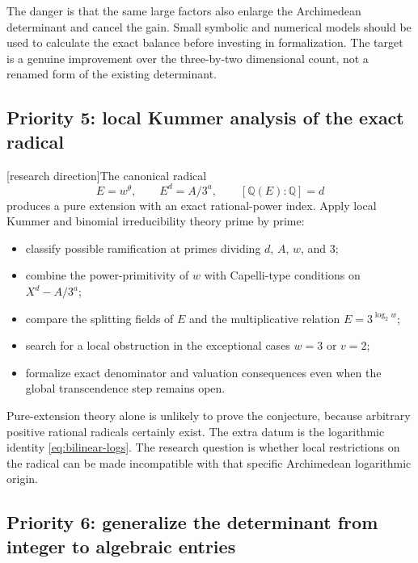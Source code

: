 \documentclass[11pt,oneside]{article}
\theoremstyle{definition}
\newcommand{\Q}{\mathbb Q}
\newcommand{\tagProposal}{\textcolor{BrickRed}{\textsf{[research direction]}}}
\begin{document}
The danger is that the same large factors also enlarge the Archimedean determinant and
cancel the gain.  Small symbolic and numerical models should be used to calculate the exact
balance before investing in formalization.  The target is a genuine improvement over the
three-by-two dimensional count, not a renamed form of the existing determinant.

\subsection{Priority 5: local Kummer analysis of the exact radical}

\tagProposal The canonical radical
\[
  E=w^\theta,
  \qquad E^d=A/3^a,
  \qquad [\Q(E):\Q]=d
\]
produces a pure extension with an exact rational-power index.  Apply local Kummer and
binomial irreducibility theory prime by prime:
\begin{itemize}
\item classify possible ramification at primes dividing \(d\), \(A\), \(w\), and \(3\);
\item combine the power-primitivity of \(w\) with Capelli-type conditions on
\(X^d-A/3^a\);
\item compare the splitting fields of \(E\) and the multiplicative relation
\(E=3^{\log_2w}\);
\item search for a local obstruction in the exceptional cases \(w=3\) or \(v=2\);
\item formalize exact denominator and valuation consequences even when the global
transcendence step remains open.
\end{itemize}

Pure-extension theory alone is unlikely to prove the conjecture, because arbitrary positive
rational radicals certainly exist.  The extra datum is the logarithmic identity
\eqref{eq:bilinear-logs}.  The research question is whether local restrictions on the
radical can be made incompatible with that specific Archimedean logarithmic origin.

\subsection{Priority 6: generalize the determinant from integer to algebraic entries}
\end{document}
